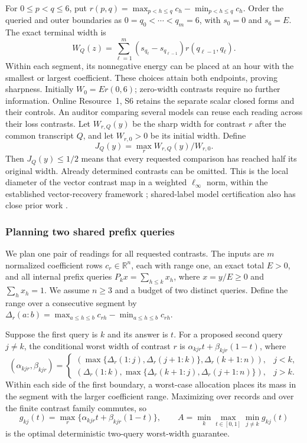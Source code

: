 \documentclass[12pt]{article}
\begin{document}
For $0\leq p<q\leq6$, put
$r(p,q)=\max_{p<h\leq q}c_h-\min_{p<h\leq q}c_h$.
Order the queried and outer boundaries as $0=q_0<\cdots<q_m=6$,
with $s_0=0$ and $s_6=E$. The exact terminal width is
\begin{equation}
 W_Q(z)=\sum_{\ell=1}^{m}
 (s_{q_\ell}-s_{q_{\ell-1}})r(q_{\ell-1},q_\ell).
 \label{eq:counter-width}
\end{equation}
Within each segment, its nonnegative energy can be placed at an hour with
the smallest or largest coefficient. These choices attain both endpoints,
proving sharpness. Initially $W_0=Er(0,6)$; zero-width contrasts require
no further information. Online Resource~1, S6 retains the separate scalar
closed forms and their controls.
An auditor comparing several models can reuse each reading across their
loss contrasts. Let $W_{r,Q}(y)$ be the sharp width for contrast $r$ after
the common transcript $Q$, and let $W_{r,0}>0$ be its initial width. Define
\[
 J_Q(y)=\max_r W_{r,Q}(y)/W_{r,0}.
\]
Then $J_Q(y)\leq1/2$ means that every requested comparison has reached
half its original width. Already determined contrasts can be omitted.
This is the local diameter of the vector contrast map in a weighted
$\ell_\infty$ norm, within the established vector-recovery framework
\citep{krieg2025}; shared-label model certification also has close prior
work \citep{kuboyama2026}.

\subsubsection{Planning two shared prefix queries}
\label{sec:shared-planner-algorithm}
We plan one pair of readings for all requested contrasts.  The inputs are
$m$ normalized coefficient rows $c_r\in\mathbb R^n$, each with range one,
an exact total $E>0$, and all internal prefix queries
$P_kx=\sum_{h\leq k}x_h$, where $x=y/E\geq0$ and $\sum_hx_h=1$.
We assume $n\geq3$ and a budget of two distinct queries.  Define the range
over a consecutive segment by
$\Delta_r(a{:}b)=\max_{a\leq h\leq b}c_{rh}-\min_{a\leq h\leq b}c_{rh}$.

Suppose the first query is $k$ and its answer is $t$.  For a proposed
second query $j\ne k$, the conditional worst width of contrast $r$ is
$\alpha_{kjr}t+\beta_{kjr}(1-t)$, where
\[
 (\alpha_{kjr},\beta_{kjr})=
 \begin{cases}
 (\max\{\Delta_r(1{:}j),\Delta_r(j+1{:}k)\},
             \Delta_r(k+1{:}n)),&j<k,\\
 (\Delta_r(1{:}k),
       \max\{\Delta_r(k+1{:}j),\Delta_r(j+1{:}n)\}),&j>k.
 \end{cases}
\]
Within each side of the first boundary, a worst-case allocation places
its mass in the segment with the larger coefficient range.  Maximizing
over records and over the finite contrast family commutes, so
\[
 g_{kj}(t)=\max_r\{\alpha_{kjr}t+\beta_{kjr}(1-t)\},\qquad
 A=\min_k\max_{t\in[0,1]}\min_{j\ne k}g_{kj}(t)
\]
is the optimal deterministic two-query worst-width guarantee.
\end{document}
